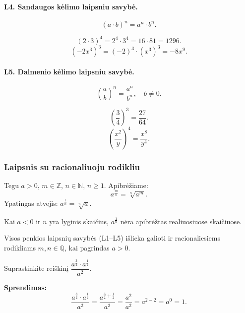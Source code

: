 \paragraph{L4. Sandaugos kėlimo laipsniu savybė.}
\[
    (a \cdot b)^n = a^n \cdot b^n.
\]

\begin{example}
\[
    (2 \cdot 3)^4 = 2^4 \cdot 3^4 = 16 \cdot 81 = 1296.
\]
\[
    (-2x^3)^3 = (-2)^3 \cdot (x^3)^3 = -8x^9.
\]
\end{example}

\paragraph{L5. Dalmenio kėlimo laipsniu savybė.}
\[
    \left(\frac{a}{b}\right)^n = \frac{a^n}{b^n}, \quad b \neq 0.
\]

\begin{example}
\[
    \left(\frac{3}{4}\right)^3 = \frac{27}{64}.
\]
\[
    \left(\frac{x^2}{y}\right)^4 = \frac{x^8}{y^4}.
\]
\end{example}

\subsubsection*{Laipsnis su racionaliuoju rodikliu}

\begin{definition}
Tegu $a > 0$, $m \in \mathbb{Z}$, $n \in \mathbb{N}$, $n \geq 1$.
Apibrėžiame:
\[
    a^{\frac{m}{n}} = \sqrt[n]{a^m}.
\]
Ypatingas atvejis: $a^{\frac{1}{n}} = \sqrt[n]{a}$.
\end{definition}

\begin{remark}
Kai $a < 0$ ir $n$ yra lyginis skaičius, $a^{\frac{1}{n}}$ nėra apibrėžtas
realiuosiuose skaičiuose.
\end{remark}

Visos penkios laipsnių savybės (L1–L5) išlieka galioti ir racionaliesiems
rodikliams $m, n \in \mathbb{Q}$, kai pagrindas $a > 0$.

\begin{example}
Suprastinkite reiškinį $\dfrac{a^{\frac{3}{2}} \cdot a^{\frac{1}{2}}}{a^2}$.

\medskip
\textbf{Sprendimas:}
\[
    \frac{a^{\frac{3}{2}} \cdot a^{\frac{1}{2}}}{a^2}
    = \frac{a^{\frac{3}{2}+\frac{1}{2}}}{a^2}
    = \frac{a^{2}}{a^2}
    = a^{2-2} = a^0 = 1.
\]
\end{example}

